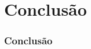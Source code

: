 \documentclass{beamer}
\begin{document}
\section{Conclusão}

\begin{frame}

\frametitle{Conclusão}

\end{frame}
\end{document}
